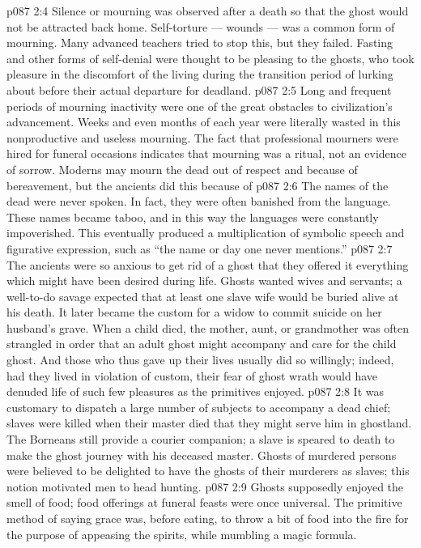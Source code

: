 \vs p087 2:4 Silence or mourning was observed after a death so that the ghost would not be attracted back home. Self\hyp{}torture --- wounds --- was a common form of mourning. Many advanced teachers tried to stop this, but they failed. Fasting and other forms of self\hyp{}denial were thought to be pleasing to the ghosts, who took pleasure in the discomfort of the living during the transition period of lurking about before their actual departure for deadland.
\vs p087 2:5 Long and frequent periods of mourning inactivity were one of the great obstacles to civilization’s advancement. Weeks and even months of each year were literally wasted in this nonproductive and useless mourning. The fact that professional mourners were hired for funeral occasions indicates that mourning was a ritual, not an evidence of sorrow. Moderns may mourn the dead out of respect and because of bereavement, but the ancients did this because of 
\vs p087 2:6 The names of the dead were never spoken. In fact, they were often banished from the language. These names became taboo, and in this way the languages were constantly impoverished. This eventually produced a multiplication of symbolic speech and figurative expression, such as “the name or day one never mentions.”
\vs p087 2:7 \pc The ancients were so anxious to get rid of a ghost that they offered it everything which might have been desired during life. Ghosts wanted wives and servants; a well\hyp{}to\hyp{}do savage expected that at least one slave wife would be buried alive at his death. It later became the custom for a widow to commit suicide on her husband’s grave. When a child died, the mother, aunt, or grandmother was often strangled in order that an adult ghost might accompany and care for the child ghost. And those who thus gave up their lives usually did so willingly; indeed, had they lived in violation of custom, their fear of ghost wrath would have denuded life of such few pleasures as the primitives enjoyed.
\vs p087 2:8 It was customary to dispatch a large number of subjects to accompany a dead chief; slaves were killed when their master died that they might serve him in ghostland. The Borneans still provide a courier companion; a slave is speared to death to make the ghost journey with his deceased master. Ghosts of murdered persons were believed to be delighted to have the ghosts of their murderers as slaves; this notion motivated men to head hunting.
\vs p087 2:9 Ghosts supposedly enjoyed the smell of food; food offerings at funeral feasts were once universal. The primitive method of saying grace was, before eating, to throw a bit of food into the fire for the purpose of appeasing the spirits, while mumbling a magic formula.
